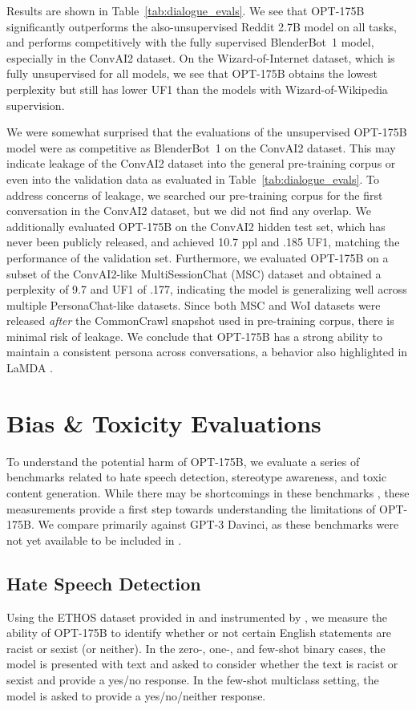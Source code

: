 \documentclass[11pt]{article}
\newcommand{\OPT}[0]{{OPT-175B}}
\newcommand{\davinci}[0]{{Davinci}}
\begin{document}
Results are shown in Table~\ref{tab:dialogue_evals}. We see that \OPT{} significantly outperforms the also-unsupervised Reddit 2.7B model on all tasks, and performs competitively with the fully supervised BlenderBot~1 model, especially in the ConvAI2 dataset. On the Wizard-of-Internet dataset, which is fully unsupervised for all models, we see that \OPT{} obtains the lowest perplexity but still has lower UF1 than the models with Wizard-of-Wikipedia supervision.

We were somewhat surprised that the evaluations of the unsupervised \OPT{} model were as competitive as BlenderBot~1 on the ConvAI2 dataset. This may indicate leakage of the ConvAI2 dataset into the general pre-training corpus or even into the validation data as evaluated in Table~\ref{tab:dialogue_evals}. To address concerns of leakage, we searched our pre-training corpus for the first conversation in the ConvAI2 dataset, but we did not find any overlap.
We additionally evaluated \OPT{} on the ConvAI2 hidden test set, which has never been publicly released, and achieved 10.7 ppl and .185 UF1, matching the performance of the validation set. Furthermore, we evaluated \OPT{} on a subset of the ConvAI2-like MultiSessionChat (MSC) dataset \cite{xu2021beyond} and obtained a perplexity of 9.7 and UF1 of .177, indicating the model is generalizing well across multiple PersonaChat-like datasets. Since both MSC and WoI datasets were released \textit{after} the CommonCrawl snapshot used in pre-training corpus, there is minimal risk of leakage. We conclude that \OPT{} has a strong ability to maintain a consistent persona across conversations, a behavior also highlighted in LaMDA \cite{thoppilan2022lamda}.

 \section{Bias \& Toxicity Evaluations}
\label{sec:rai_evals}

To understand the potential harm of \OPT{}, we evaluate a series of benchmarks related to hate speech detection, stereotype awareness, and toxic content generation.  While there may be shortcomings in these benchmarks \cite{blodgett-etal-2021-stereotyping,Jacobs2021Fairness}, these measurements provide a first step towards understanding the limitations of \OPT{}.  We compare primarily against GPT-3 \davinci{}, as these benchmarks were not yet available to be included in  \citet{brown2020gpt3}.

\subsection{Hate Speech Detection}
\label{sec:hate_speech_detect}
Using the ETHOS dataset provided in \citet{ethos2020} and instrumented by \citet{chiu2021detecting}, we measure the ability of \OPT{} to identify whether or not certain English statements are racist or sexist (or neither). In the zero-, one-, and few-shot binary cases, the model is presented with text and asked to consider whether the text is racist or sexist and provide a yes/no response. In the few-shot multiclass setting, the model is asked to provide a yes/no/neither response.
\end{document}
